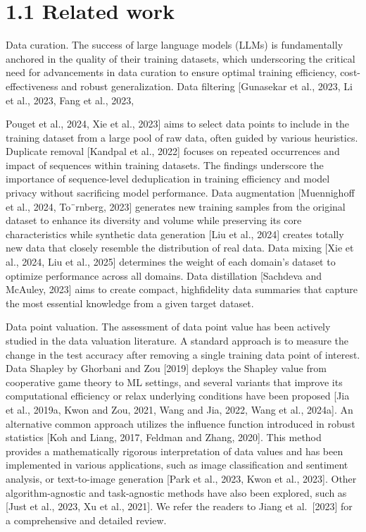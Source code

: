 \section{1.1 Related work}\label{related-work}

Data curation. The success of large language models (LLMs) is
fundamentally anchored in the quality of their training datasets, which
underscoring the critical need for advancements in data curation to
ensure optimal training efficiency, cost-effectiveness and robust
generalization. Data filtering {[}Gunasekar et al., 2023, Li et al.,
2023, Fang et al., 2023,

Pouget et al., 2024, Xie et al., 2023{]} aims to select data points to
include in the training dataset from a large pool of raw data, often
guided by various heuristics. Duplicate removal {[}Kandpal et al.,
2022{]} focuses on repeated occurrences and impact of sequences within
training datasets. The findings underscore the importance of
sequence-level deduplication in training efficiency and model privacy
without sacrificing model performance. Data augmentation {[}Muennighoff
et al., 2024, To¨rnberg, 2023{]} generates new training samples from the
original dataset to enhance its diversity and volume while preserving
its core characteristics while synthetic data generation {[}Liu et al.,
2024{]} creates totally new data that closely resemble the distribution
of real data. Data mixing {[}Xie et al., 2024, Liu et al., 2025{]}
determines the weight of each domain's dataset to optimize performance
across all domains. Data distillation {[}Sachdeva and McAuley, 2023{]}
aims to create compact, highfidelity data summaries that capture the
most essential knowledge from a given target dataset.

Data point valuation. The assessment of data point value has been
actively studied in the data valuation literature. A standard approach
is to measure the change in the test accuracy after removing a single
training data point of interest. Data Shapley by Ghorbani and Zou
{[}2019{]} deploys the Shapley value from cooperative game theory to ML
settings, and several variants that improve its computational efficiency
or relax underlying conditions have been proposed {[}Jia et al., 2019a,
Kwon and Zou, 2021, Wang and Jia, 2022, Wang et al., 2024a{]}. An
alternative common approach utilizes the influence function introduced
in robust statistics {[}Koh and Liang, 2017, Feldman and Zhang, 2020{]}.
This method provides a mathematically rigorous interpretation of data
values and has been implemented in various applications, such as image
classification and sentiment analysis, or text-to-image generation
{[}Park et al., 2023, Kwon et al., 2023{]}. Other algorithm-agnostic and
task-agnostic methods have also been explored, such as {[}Just et al.,
2023, Xu et al., 2021{]}. We refer the readers to Jiang et
al.~{[}2023{]} for a comprehensive and detailed review.

